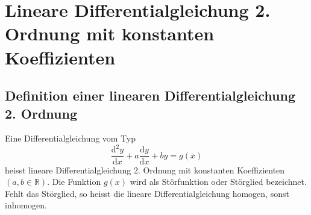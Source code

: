 \section{Lineare Differentialgleichung 2. Ordnung mit konstanten Koeffizienten}
\subsection{Definition einer linearen Differentialgleichung 2. Ordnung}
Eine Differentialgleichung vom Typ 
\begin{equation}
\boxed{\dfrac{\text{d}^2y}{\text{d}x}+a\dfrac{\text{d}y}{\text{d}x}+by=g\left(x\right)}
\end{equation}
heisst lineare Differentialgleichung 2. Ordnung mit konstanten Koeffizienten $\left(a, b\in \mathbb{R}\right)$. Die Funktion $g\left(x\right)$ wird als Störfunktion oder Störglied bezeichnet. Fehlt das Störglied, so heisst die lineare Differentialgleichung homogen, sonst inhomogen.
